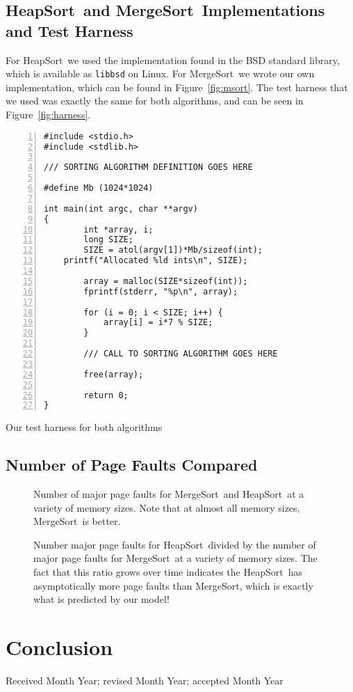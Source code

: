 \documentclass{acmtrans2m}
\newcommand{\heapsort}{{\sc HeapSort}}
\newcommand{\mergesort}{{\sc MergeSort}}
\begin{document}
\subsection{\heapsort\ and \mergesort\ Implementations and Test Harness}

For \heapsort\ we used the implementation found in the BSD standard library, which is available as {\tt libbsd} on Linux.  For \mergesort\ we wrote our own implementation, which can be found in Figure~\ref{fig:msort}.  The test harness that we used was exactly the same for both algorithms, and can be seen in Figure~\ref{fig:harness}.

\begin{narrowfig}{3in}
\begin{Verbatim}[numbers=left,numbersep=3pt,xleftmargin=20pt]
#include <stdio.h>
#include <stdlib.h>

/// SORTING ALGORITHM DEFINITION GOES HERE

#define Mb (1024*1024)

int main(int argc, char **argv)
{
        int *array, i;
        long SIZE;
        SIZE = atol(argv[1])*Mb/sizeof(int);
	printf("Allocated %ld ints\n", SIZE);

        array = malloc(SIZE*sizeof(int));
        fprintf(stderr, "%p\n", array);
        
        for (i = 0; i < SIZE; i++) {
            array[i] = i*7 % SIZE;
        }

        /// CALL TO SORTING ALGORITHM GOES HERE

        free(array);

        return 0;
}
\end{Verbatim}
\caption{Our test harness for both algorithms}
\label{fig:harness}
\end{narrowfig}

\subsection{Number of Page Faults Compared}

\begin{figure}

\caption{Number of major page faults for \mergesort\ and \heapsort\ at a variety of memory sizes.  Note that at almost all memory sizes, \mergesort\ is better.}
\end{figure}

\begin{figure}

\caption{Number major page faults for \heapsort\ divided by the number of major page faults for \mergesort\ at a variety of memory sizes.  The fact that this ratio grows over time indicates the \heapsort\ has asymptotically more page faults than \mergesort, which is exactly what is predicted by our model!}
\end{figure}

\section{Conclusion}




\begin{received} 
Received Month Year; revised Month Year; accepted Month Year 
\end{received}
\end{document}
